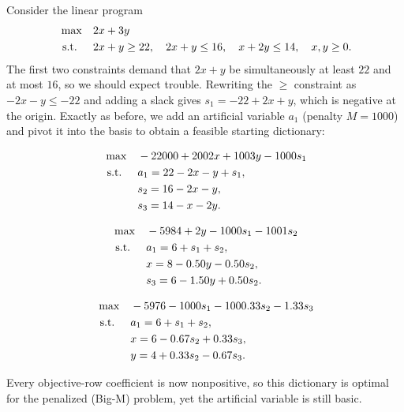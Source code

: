 Consider the linear program
\[
\begin{aligned}
\max\quad & 2x + 3y \\
\mbox{ s.t. }\quad & 2x + y \geq 22,\quad 2x + y \leq 16,\quad x + 2y \leq 14,\quad x,y \geq 0.
\end{aligned}
\]
The first two constraints demand that $2x+y$ be simultaneously at least $22$ and at most $16$, so we should expect trouble. Rewriting the $\ge$ constraint as $-2x-y\le-22$ and adding a slack gives $s_1 = -22 + 2x + y$, which is negative at the origin. Exactly as before, we add an artificial variable $a_1$ (penalty $M=1000$) and pivot it into the basis to obtain a feasible starting dictionary:
\begin{center}\begin{dict}
\[
\begin{aligned}
\max\quad & -22000 + 2002x + 1003y - 1000s_1 \\
\mbox{ s.t. }\quad & a_1 = 22 - 2x - y + s_1,\\
& s_2 = 16 - 2x - y,\\
& s_3 = 14 - x - 2y.
\end{aligned}
\]
\end{dict}\end{center}
\begin{center}\begin{dict}
\[
\begin{aligned}
\max\quad & -5984 + 2y - 1000s_1 - 1001s_2 \\
\mbox{ s.t. }\quad & a_1 = 6 + s_1 + s_2,\\
& x = 8 - 0.50y - 0.50s_2,\\
& s_3 = 6 - 1.50y + 0.50s_2.
\end{aligned}
\]
\end{dict}\end{center}
\begin{center}
\begin{tcolorbox}[enhanced,width=0.6\linewidth,box align=center,colback=red!4,colframe=red!65!black,
  boxrule=0.8pt,sharp corners,coltitle=white,fonttitle=\bfseries,
  title={\ding{56}\ Optimal for Big-M: artificial stuck in basis},
  left=6pt,right=6pt,top=3pt,bottom=3pt]
\[
\begin{aligned}
\max\quad & -5976 - 1000s_1 - 1000.33s_2 - 1.33s_3 \\
\mbox{ s.t. }\quad & a_1 = 6 + s_1 + s_2,\\
& x = 6 - 0.67s_2 + 0.33s_3,\\
& y = 4 + 0.33s_2 - 0.67s_3.
\end{aligned}
\]
\end{tcolorbox}
\end{center}
Every objective-row coefficient is now nonpositive, so this dictionary is optimal for the penalized (Big-M) problem, yet the artificial variable is still basic.

